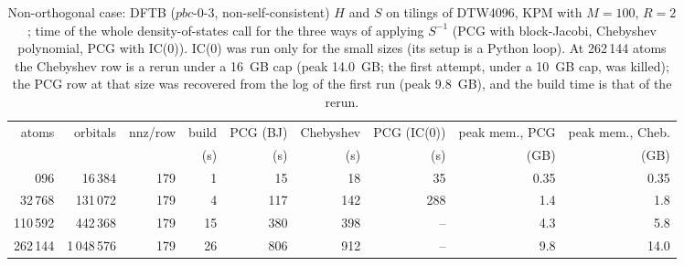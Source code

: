 \begin{table}[t]\caption{Non-orthogonal case: DFTB ($pbc$-0-3, non-self-consistent) $H$ and $S$ on tilings of DTW4096, KPM with $M=100$, $R=2$; time of the whole density-of-states call for the three ways of applying $S^{-1}$ (PCG with block-Jacobi, Chebyshev polynomial, PCG with IC(0)). IC(0) was run only for the small sizes (its setup is a Python loop). At 262\,144 atoms the Chebyshev row is a rerun under a 16~GB cap (peak 14.0~GB; the first attempt, under a 10~GB cap, was killed); the PCG row at that size was recovered from the log of the first run (peak 9.8~GB), and the build time is that of the rerun.}\label{tab:sk}\begin{ruledtabular}\begin{tabular}{rrrrrrrrr}
atoms & orbitals & nnz/row & build & PCG (BJ) & Chebyshev & PCG (IC(0)) & peak mem., PCG & peak mem., Cheb. \\ & & & (s) & (s) & (s) & (s) & (GB) & (GB) \\ \colrule
4\,096 & 16\,384 & 179 & 1 & 15 & 18 & 35 & 0.35 & 0.35 \\
32\,768 & 131\,072 & 179 & 4 & 117 & 142 & 288 & 1.4 & 1.8 \\
110\,592 & 442\,368 & 179 & 15 & 380 & 398 & -- & 4.3 & 5.8 \\
262\,144 & 1\,048\,576 & 179 & 26 & 806 & 912 & -- & 9.8 & 14.0 \\
\end{tabular}\end{ruledtabular}\end{table}
